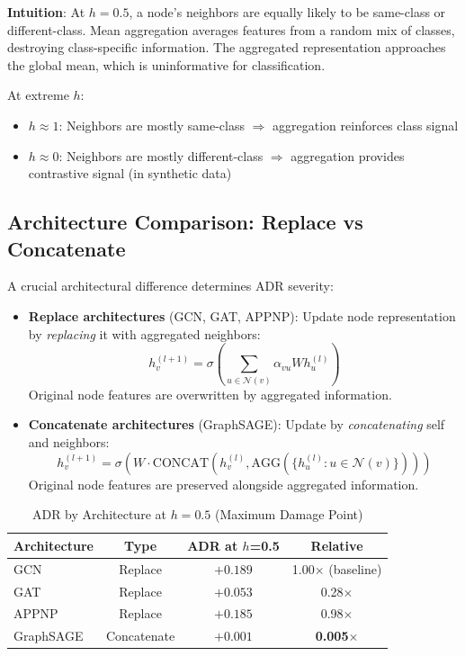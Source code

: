 \textbf{Intuition}: At $h = 0.5$, a node's neighbors are equally likely to be same-class or different-class. Mean aggregation averages features from a random mix of classes, destroying class-specific information. The aggregated representation approaches the global mean, which is uninformative for classification.

At extreme $h$:
\begin{itemize}
    \item $h \approx 1$: Neighbors are mostly same-class $\Rightarrow$ aggregation reinforces class signal
    \item $h \approx 0$: Neighbors are mostly different-class $\Rightarrow$ aggregation provides contrastive signal (in synthetic data)
\end{itemize}

\subsection{Architecture Comparison: Replace vs Concatenate}

A crucial architectural difference determines ADR severity:

\begin{itemize}
    \item \textbf{Replace architectures} (GCN, GAT, APPNP): Update node representation by \textit{replacing} it with aggregated neighbors:
    \begin{equation}
        h_v^{(l+1)} = \sigma\left( \sum_{u \in \mathcal{N}(v)} \alpha_{vu} W h_u^{(l)} \right)
    \end{equation}
    Original node features are overwritten by aggregated information.

    \item \textbf{Concatenate architectures} (GraphSAGE): Update by \textit{concatenating} self and neighbors:
    \begin{equation}
        h_v^{(l+1)} = \sigma\left( W \cdot \text{CONCAT}(h_v^{(l)}, \text{AGG}(\{h_u^{(l)} : u \in \mathcal{N}(v)\})) \right)
    \end{equation}
    Original node features are preserved alongside aggregated information.
\end{itemize}

\begin{table}[t]
\centering
\caption{ADR by Architecture at $h = 0.5$ (Maximum Damage Point)}
\label{tab:adr_architecture}
\begin{tabular}{@{}lccc@{}}
\toprule
\textbf{Architecture} & \textbf{Type} & \textbf{ADR at $h$=0.5} & \textbf{Relative} \\
\midrule
GCN & Replace & $+0.189$ & 1.00$\times$ (baseline) \\
GAT & Replace & $+0.053$ & 0.28$\times$ \\
APPNP & Replace & $+0.185$ & 0.98$\times$ \\
\midrule
GraphSAGE & Concatenate & $+0.001$ & \textbf{0.005$\times$} \\
\bottomrule
\end{tabular}
\end{table}


